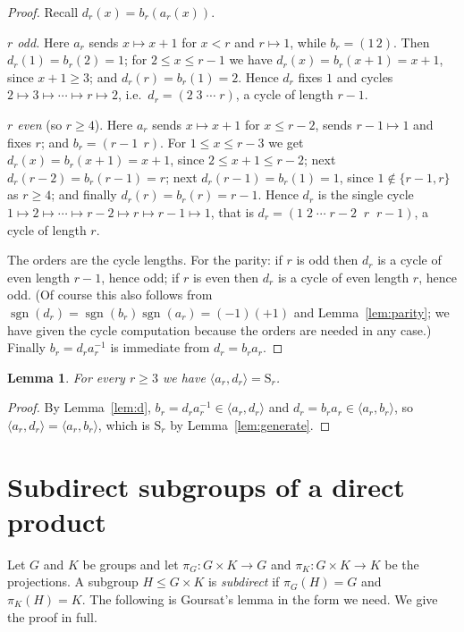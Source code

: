 \documentclass[11pt]{article}
\theoremstyle{plain}
\newtheorem{lemma}[theorem]{Lemma}
\theoremstyle{definition}
\theoremstyle{remark}
\numberwithin{equation}{section}
\newcommand{\Sym}{\mathrm{S}}
\DeclareMathOperator{\sgn}{sgn}
\begin{document}
\begin{proof}
Recall $d_r(x) = b_r(a_r(x))$.

\emph{$r$ odd.} Here $a_r$ sends $x \mapsto x+1$ for $x < r$ and $r \mapsto 1$, while
$b_r = (1\,2)$. Then $d_r(1) = b_r(2) = 1$; for $2 \le x \le r-1$ we have
$d_r(x) = b_r(x+1) = x+1$, since $x+1 \ge 3$; and $d_r(r) = b_r(1) = 2$. Hence $d_r$ fixes $1$
and cycles $2 \mapsto 3 \mapsto \cdots \mapsto r \mapsto 2$, i.e.\ $d_r = (2\;3\;\cdots\;r)$, a
cycle of length $r-1$.

\emph{$r$ even} (so $r \ge 4$). Here $a_r$ sends $x \mapsto x+1$ for $x \le r-2$, sends
$r-1 \mapsto 1$ and fixes $r$; and $b_r = (r-1\;\,r)$. For $1 \le x \le r-3$ we get
$d_r(x) = b_r(x+1) = x+1$, since $2 \le x+1 \le r-2$; next $d_r(r-2) = b_r(r-1) = r$;
next $d_r(r-1) = b_r(1) = 1$, since $1 \notin \{r-1,r\}$ as $r \ge 4$; and finally
$d_r(r) = b_r(r) = r-1$. Hence $d_r$ is the single cycle
$1 \mapsto 2 \mapsto \cdots \mapsto r-2 \mapsto r \mapsto r-1 \mapsto 1$, that is
$d_r = (1\;2\;\cdots\;r{-}2\;\;r\;\;r{-}1)$, a cycle of length $r$.

The orders are the cycle lengths. For the parity: if $r$ is odd then $d_r$ is a cycle of even
length $r-1$, hence odd; if $r$ is even then $d_r$ is a cycle of even length $r$, hence odd. (Of
course this also follows from $\sgn(d_r) = \sgn(b_r)\sgn(a_r) = (-1)(+1)$ and
Lemma~\ref{lem:parity}; we have given the cycle computation because the orders are needed in any
case.) Finally $b_r = d_r a_r^{-1}$ is immediate from $d_r = b_r a_r$.
\end{proof}

\begin{lemma}
\label{lem:generate2}
For every $r \ge 3$ we have $\langle a_r, d_r \rangle = \Sym_r$.
\end{lemma}

\begin{proof}
By Lemma~\ref{lem:d}, $b_r = d_r a_r^{-1} \in \langle a_r,d_r\rangle$ and
$d_r = b_r a_r \in \langle a_r,b_r\rangle$, so $\langle a_r,d_r\rangle = \langle
a_r,b_r\rangle$, which is $\Sym_r$ by Lemma~\ref{lem:generate}.
\end{proof}

\section{Subdirect subgroups of a direct product}
\label{sec:goursat}

Let $G$ and $K$ be groups and let $\pi_G : G \times K \to G$ and $\pi_K : G\times K \to K$ be the
projections. A subgroup $H \le G \times K$ is \emph{subdirect} if $\pi_G(H) = G$ and
$\pi_K(H) = K$. The following is Goursat's lemma \cite{goursat} in the form we need. We give the
proof in full.
\end{document}
